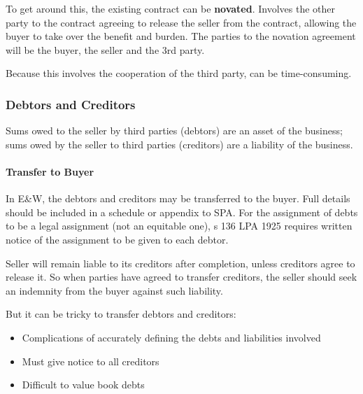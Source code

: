 \documentclass[
]{article}
\newenvironment{Shaded}{}{}
\newcommand{\NormalTok}[1]{#1}
\providecommand{\tightlist}{%
  \setlength{\itemsep}{0pt}\setlength{\parskip}{0pt}}
\begin{document}
To get around this, the existing contract can be \textbf{novated}.
Involves the other party to the contract agreeing to release the seller
from the contract, allowing the buyer to take over the benefit and
burden. The parties to the novation agreement will be the buyer, the
seller and the 3rd party.

\begin{Shaded}
\begin{Highlighting}[]
\NormalTok{Because this involves the cooperation of the third party, can be time{-}consuming. }
\end{Highlighting}
\end{Shaded}

\hypertarget{debtors-and-creditors}{%
\subsubsection{Debtors and Creditors}\label{debtors-and-creditors}}

Sums owed to the seller by third parties (debtors) are an asset of the
business; sums owed by the seller to third parties (creditors) are a
liability of the business.

\hypertarget{transfer-to-buyer}{%
\paragraph{Transfer to Buyer}\label{transfer-to-buyer}}

In E\&W, the debtors and creditors may be transferred to the buyer. Full
details should be included in a schedule or appendix to SPA. For the
assignment of debts to be a legal assignment (not an equitable one), s
136 LPA 1925 requires written notice of the assignment to be given to
each debtor.

Seller will remain liable to its creditors after completion, unless
creditors agree to release it. So when parties have agreed to transfer
creditors, the seller should seek an indemnity from the buyer against
such liability.

But it can be tricky to transfer debtors and creditors:

\begin{itemize}
\tightlist
\item
  Complications of accurately defining the debts and liabilities
  involved
\item
  Must give notice to all creditors
\item
  Difficult to value book debts
\end{itemize}
\end{document}
